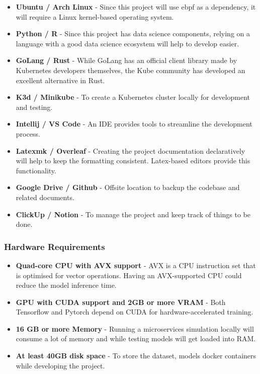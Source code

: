 \begin{itemize}[noitemsep,nolistsep] 
\item \textbf{Ubuntu / Arch Linux} - Since this project will use \ac{ebpf} as a dependency, it will require a Linux kernel-based operating system.
\item \textbf{Python / R} - Since this project has data science components, relying on a language with a good data science ecosystem will help to develop easier.
\item \textbf{GoLang / Rust} - While GoLang has an official client library made by Kubernetes developers themselves, the Kube community has developed an excellent alternative in Rust.
\item \textbf{K3d / Minikube} - To create a Kubernetes cluster locally for development and testing.
\item \textbf{Intellij / VS Code} - An IDE provides tools to streamline the development process.
\item \textbf{Latexmk / Overleaf} - Creating the project documentation declaratively will help to keep the formatting consistent. Latex-based editors provide this functionality.
\item \textbf{Google Drive / Github} - Offsite location to backup the codebase and related documents.
\item \textbf{ClickUp / Notion} - To manage the project and keep track of things to be done.
\end{itemize}

\subsubsection{Hardware Requirements}
\begin{itemize}[noitemsep,nolistsep] 
    \item \textbf{Quad-core CPU with AVX support} - AVX is a CPU instruction set that is optimised for vector operations. Having an AVX-supported CPU could reduce the model inference time.
    \item \textbf{GPU with CUDA support and 2GB or more VRAM} - Both Tensorflow and Pytorch depend on CUDA for hardware-accelerated training.
    \item \textbf{16 GB or more Memory} - Running a microservices simulation locally will consume a lot of memory and while testing models will get loaded into RAM.
    \item \textbf{At least 40GB disk space} - To store the dataset, models docker containers while developing the project.
\end{itemize}

